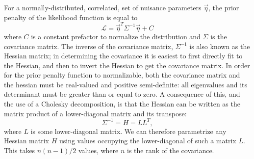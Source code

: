 \documentclass[main.tex]{subfiles}
\begin{document}
For a normally-distributed, correlated, set of nuisance parameters $\vec{\eta}$, the prior penalty of the likelihood function is equal to 
\begin{equation}
    \mathcal{L} = \vec{\eta}^{T} \Sigma^{-1} \vec{\eta} + C
\end{equation} 
where $C$ is a constant prefactor to normalize the distribution and $\Sigma$ is the covariance matrix.
The inverse of the covariance matrix, $\Sigma^{-1}$ is also known as the Hessian matrix; in determining the covariance it is easiest to first directly fit to the Hessian, and then to invert the Hessian to get the covariance matrix.
In order for the prior penalty function to normalizable, both the covariance matrix and the hessian must be real-valued and positive semi-definite: all eigenvalues and its determinant must be greater than or equal to zero. 
A consequence of this, and the use of a Cholesky decomposition, is that the Hessian can be written as the matrix product of a lower-diagonal matrix and its transpose:
\begin{equation}
    \Sigma^{-1} = H = LL^{T},
\end{equation} 
where $L$ is some lower-diagonal matrix. 
We can therefore parametrize any Hessian matrix $H$ using values occupying the lower-diagonal of such a matrix $L$. This takes $n(n-1)/2$ values, where $n$ is the rank of the covariance. 
\end{document}

